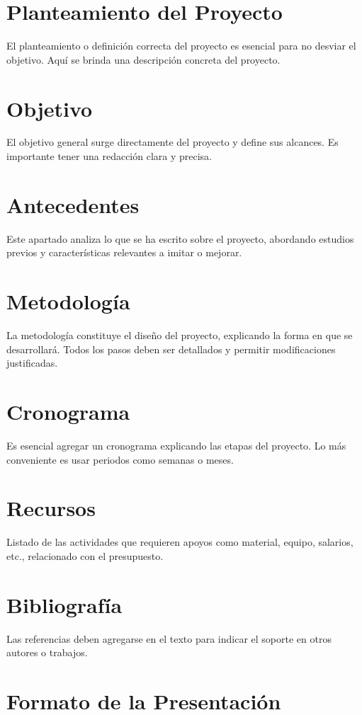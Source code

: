 
\section*{Planteamiento del Proyecto}
El planteamiento o definición correcta del proyecto es esencial para no desviar el objetivo. Aquí se brinda una descripción concreta del proyecto.

\section*{Objetivo}
El objetivo general surge directamente del proyecto y define sus alcances. Es importante tener una redacción clara y precisa.

\section*{Antecedentes}
Este apartado analiza lo que se ha escrito sobre el proyecto, abordando estudios previos y características relevantes a imitar o mejorar.

\section*{Metodología}
La metodología constituye el diseño del proyecto, explicando la forma en que se desarrollará. Todos los pasos deben ser detallados y permitir modificaciones justificadas.

\section*{Cronograma}
Es esencial agregar un cronograma explicando las etapas del proyecto. Lo más conveniente es usar periodos como semanas o meses.

\section*{Recursos}
Listado de las actividades que requieren apoyos como material, equipo, salarios, etc., relacionado con el presupuesto.

\section*{Bibliografía}
Las referencias deben agregarse en el texto para indicar el soporte en otros autores o trabajos.

\section*{Formato de la Presentación}
